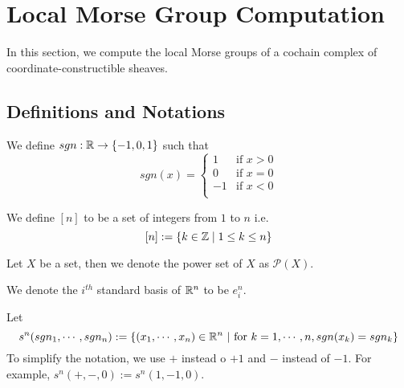 \section{Local Morse Group Computation}
In this section, we compute the local Morse groups of a cochain complex of coordinate-constructible sheaves.
\subsection{Definitions and Notations}
\begin{definition}
We define $sgn : \mathbb{R} \rightarrow \{-1,0,1\}$ such that
\[
sgn(x)=
\begin{cases}
    1 & \text{if } x>0\\
    0 & \text{if } x=0\\
    -1 & \text{if } x<0\\
\end{cases}
\]
\end{definition}
\begin{definition}
We define $[n]$ to be a set of integers from $1$ to $n$ i.e.
\[
[n] := \{k \in \mathbb{Z} \mid 1\leq k \leq n\}
\]
\end{definition}
\begin{definition}
Let $X$ be a set, then we denote the power set of $X$ as $\mathcal{P}(X)$.
\end{definition}
\begin{definition}
We denote the $i^{th}$ standard basis of $\mathbb{R}^n$ to be $e^n_i$.
\end{definition}
\begin{definition}
Let
\[
s^n(sgn_1,\cdots,sgn_n):= \{(x_1,\cdots,x_n)\in \mathbb{R}^n ~|~ \text{for }k=1,\cdots,n, sgn(x_k)=sgn_k\}
\]
To simplify the notation, we use $+$ instead o $+1$ and $-$ instead of $-1$. For example, $s^n(+,-,0):= s^n(1,-1,0)$.
\end{definition}
